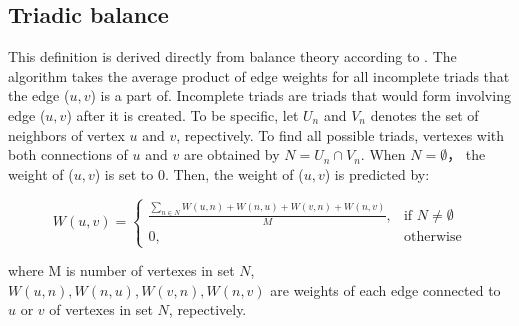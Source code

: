 \subsection{Triadic balance}
This definition is derived directly from
balance theory according to \cite{}. The algorithm takes the average product of edge weights for all incomplete triads
that the edge ($u,v$) is a part of. Incomplete triads are triads that would form involving
edge ($u,v$) after it is created. To be specific, let $U_n$ and $V_n$ denotes the set of
neighbors of vertex $u$ and $v$, repectively. To find all possible triads, vertexes with
both connections of $u$ and $v$ are obtained by $N = U_n \cap V_n$. When $N = \emptyset$，
the weight of ($u,v$) is set to 0. Then, the weight of ($u,v$)
is predicted by:

\begin{equation}
W(u,v) = 
\begin{cases}
\frac{\sum_{n\in N}W(u,n)+W(n,u)+W(v,n)+W(n,v)}{M}, & \text{if $N \neq \emptyset$} \\
0, & \text{otherwise}
\end{cases}
\end{equation}

where M is number of vertexes in set $N$, $W(u,n), W(n,u), W(v,n), W(n,v)$ are weights of each edge connected
to $u$ or $v$ of vertexes in set $N$, repectively.